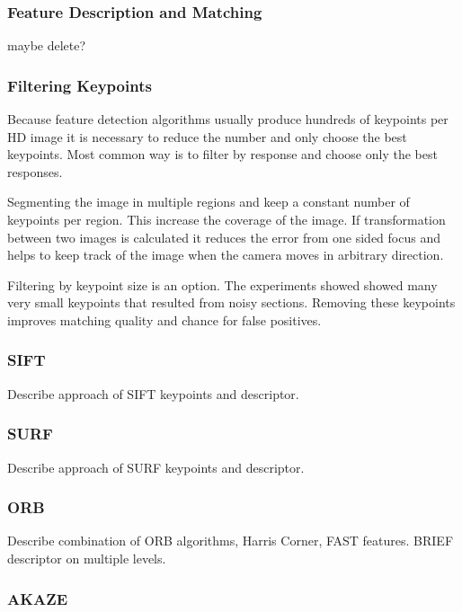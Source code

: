 \subsubsection{Feature Description and Matching}

maybe delete?

\subsubsection{Filtering Keypoints}

Because feature detection algorithms usually produce hundreds of keypoints per HD image it is necessary to reduce the number and only choose the best keypoints.
Most common way is to filter by response and choose only the best responses.

Segmenting the image in multiple regions and keep a constant number of keypoints per region.
This increase the coverage of the image.
If transformation between two images is calculated it reduces the error from one sided focus and helps to keep track of the image when the camera moves in arbitrary direction.

Filtering by keypoint size is an option. The experiments showed showed many very small keypoints that resulted from noisy sections.
Removing these keypoints improves matching quality and chance for false positives.

\subsubsection{SIFT}

Describe approach of SIFT keypoints and descriptor.

\subsubsection{SURF}

Describe approach of SURF keypoints and descriptor.

\subsubsection{ORB}

Describe combination of ORB algorithms, Harris Corner, FAST features.
BRIEF descriptor on multiple levels.

\subsubsection{AKAZE}

